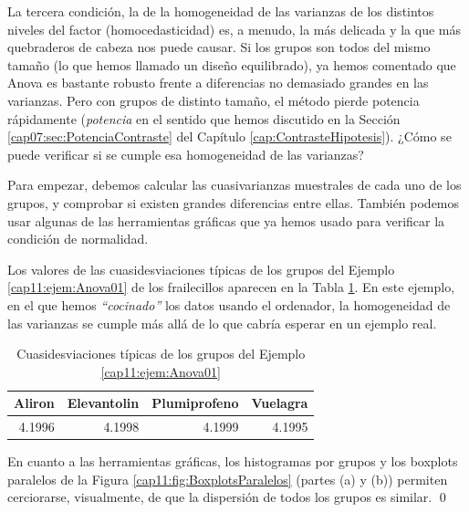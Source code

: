La tercera condición, la de la homogeneidad de las varianzas de los distintos niveles del factor (homocedasticidad) es, a menudo, la más delicada y la que más quebraderos de cabeza nos puede causar. Si los grupos son todos del mismo tamaño (lo que hemos llamado un diseño equilibrado),  ya hemos comentado que Anova es bastante robusto frente a diferencias no demasiado grandes en las varianzas. Pero con grupos de distinto tamaño, el método pierde potencia rápidamente ({\em potencia} en el sentido que hemos discutido en la Sección \ref{cap07:sec:PotenciaContraste} del Capítulo \ref{cap:ContrasteHipotesis}). ¿Cómo se puede verificar si se cumple esa homogeneidad de las varianzas?

Para empezar, debemos calcular las cuasivarianzas muestrales de cada uno de los grupos, y comprobar si existen grandes diferencias entre ellas. También podemos usar algunas de las herramientas gráficas que ya hemos usado para verificar la condición de normalidad.
\begin{ejemplo}
Los valores de las cuasidesviaciones típicas de los grupos del Ejemplo \ref{cap11:ejem:Anova01} de los frailecillos aparecen en la Tabla \ref{cap11:tabla:CuasidesviacionesPorGruposEjemploFrailecillos}. En este ejemplo, en el que hemos {\em ``cocinado''} los datos usando el ordenador, la homogeneidad de las varianzas se cumple más allá de lo que cabría esperar en un ejemplo real.
\begin{table}[ht]
\centering
\begin{tabular}{rrrr}
  \hline
 Aliron & Elevantolin & Plumiprofeno & Vuelagra \\
  \hline
 4.1996 & 4.1998 & 4.1999 & 4.1995 \\
   \hline
\end{tabular}
\caption{Cuasidesviaciones típicas de los grupos del Ejemplo \ref{cap11:ejem:Anova01}}
\label{cap11:tabla:CuasidesviacionesPorGruposEjemploFrailecillos}
\end{table}
En cuanto a las herramientas gráficas, los histogramas por grupos y los boxplots paralelos de la Figura \ref{cap11:fig:BoxplotsParalelos} (partes (a) y (b)) permiten cerciorarse, visualmente, de que la dispersión de todos los grupos es similar.
\qed
\end{ejemplo}

